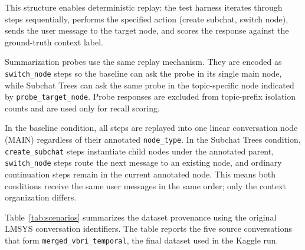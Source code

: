 This structure enables deterministic replay: the test harness iterates through steps sequentially, performs the specified action (create subchat, switch node), sends the user message to the target node, and scores the response against the ground-truth context label.

Summarization probes use the same replay mechanism. They are encoded as \texttt{switch\_node} steps so the baseline can ask the probe in its single main node, while Subchat Trees can ask the same probe in the topic-specific node indicated by \texttt{probe\_target\_node}. Probe responses are excluded from topic-prefix isolation counts and are used only for recall scoring.

In the baseline condition, all steps are replayed into one linear conversation node (MAIN) regardless of their annotated \texttt{node\_type}. In the Subchat Trees condition, \texttt{create\_subchat} steps instantiate child nodes under the annotated parent, \texttt{switch\_node} steps route the next message to an existing node, and ordinary continuation steps remain in the current annotated node. This means both conditions receive the same user messages in the same order; only the context organization differs.

Table~\ref{tab:scenarios} summarizes the dataset provenance using the original LMSYS conversation identifiers. The table reports the five source conversations that form \texttt{merged\_vbri\_temporal}, the final dataset used in the Kaggle run.

